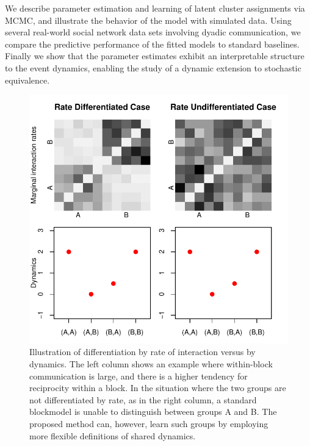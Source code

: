 We describe parameter estimation and learning of  latent cluster assignments via MCMC, and illustrate the behavior of the model with simulated data.
Using several real-world social network data sets involving dyadic communication, we compare the predictive performance of the fitted models to standard baselines.
Finally we show that the parameter estimates exhibit an interpretable structure to the event dynamics, enabling the study of a dynamic extension to stochastic equivalence.

\begin{figure}
\centering
\includegraphics[scale=.45]{../figs/introexample/all}
\caption{Illustration of differentiation by rate of interaction versus by dynamics.  The left column shows an example where within-block communication is large, and there is a higher tendency for reciprocity within a block.  In the situation where the two groups are not differentiated by rate, as in the right column, a standard blockmodel is unable to distinguish between groups A and B.  The proposed method can, however, learn such groups by employing more flexible definitions of shared dynamics.}
\label{fig:example}
\end{figure}
